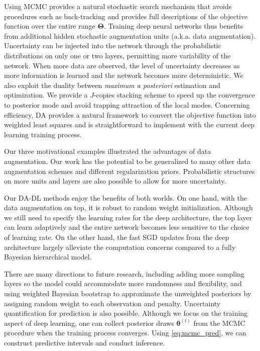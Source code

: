 \documentclass[ba]{imsart}
\newcommand{\bm}[1]{\boldsymbol{#1}}
\def\btheta{\bm{\theta}}
\def\bTheta{\bm{\Theta}}
\numberwithin{equation}{section}
\theoremstyle{plain}
\begin{document}
Using MCMC  provides a natural stochastic search mechanism that avoids procedures such as back-tracking and provides full descriptions of the objective function over the entire range $\bTheta$. Training deep neural networks thus benefits from additional hidden stochastic augmentation units (a.k.a. data augmentation).  Uncertainty can be injected into the network through the probabilistic distributions on only one or two layers, permitting more variability of the network. When more data are observed, the level of uncertainty decreases as more information is learned and the network becomes more deterministic. We also exploit the duality between \textit{maximum a posteriori} estimation and optimization.  We provide a $J$-copies stacking scheme to speed up the convergence to posterior mode and avoid trapping attraction of the local modes. Concerning efficiency, DA provides a natural framework to convert the objective function into weighted least squares and  is straightforward to implement with the current deep learning training process. 

Our three motivational examples illustrated the advantages of data augmentation. Our work has the potential to be generalized to many other data augmentation schemes and different regularization priors. Probabilistic structures on more units and layers are also possible to allow for more uncertainty. 

Our DA-DL methods enjoy the benefits of both worlds. On one hand, with the data augmentation on top,  it is  robust to random weight initialization. Although we still need to specify the learning rates for the deep architecture, the top layer can learn adaptively and the entire network becomes less sensitive to the choice of learning rate. On the other hand, the fast SGD updates from the deep architecture largely alleviate the computation concerns compared to a fully Bayesian hierarchical model.

There are many directions to future research, including adding more sampling layers so the model could accommodate more randomness and flexibility, and using weighted Bayesian bootstrap \citep{newton2018weighted} to approximate the unweighted posteriors by assigning random weight to each observation and penalty. Uncertainty quantification for prediction is also possible. Although we focus on the training aspect of deep learning, one can collect posterior draws $\btheta^{(t)}$  from the MCMC procedure when the training process converges. Using \eqref{eq:mcmc_pred}, we can construct predictive intervals and conduct inference.



 
\end{document}
